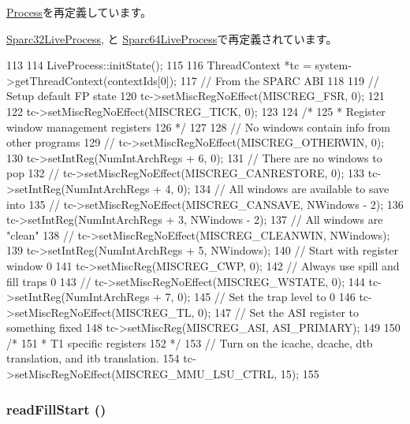 \hyperlink{classProcess_a3c34ea9b29f410748d4435a667484924}{Process}を再定義しています。

\hyperlink{classSparc32LiveProcess_a3c34ea9b29f410748d4435a667484924}{Sparc32LiveProcess}, と \hyperlink{classSparc64LiveProcess_a3c34ea9b29f410748d4435a667484924}{Sparc64LiveProcess}で再定義されています。


\begin{DoxyCode}
113 {
114     LiveProcess::initState();
115 
116     ThreadContext *tc = system->getThreadContext(contextIds[0]);
117     // From the SPARC ABI
118 
119     // Setup default FP state
120     tc->setMiscRegNoEffect(MISCREG_FSR, 0);
121 
122     tc->setMiscRegNoEffect(MISCREG_TICK, 0);
123 
124     /*
125      * Register window management registers
126      */
127 
128     // No windows contain info from other programs
129     // tc->setMiscRegNoEffect(MISCREG_OTHERWIN, 0);
130     tc->setIntReg(NumIntArchRegs + 6, 0);
131     // There are no windows to pop
132     // tc->setMiscRegNoEffect(MISCREG_CANRESTORE, 0);
133     tc->setIntReg(NumIntArchRegs + 4, 0);
134     // All windows are available to save into
135     // tc->setMiscRegNoEffect(MISCREG_CANSAVE, NWindows - 2);
136     tc->setIntReg(NumIntArchRegs + 3, NWindows - 2);
137     // All windows are "clean"
138     // tc->setMiscRegNoEffect(MISCREG_CLEANWIN, NWindows);
139     tc->setIntReg(NumIntArchRegs + 5, NWindows);
140     // Start with register window 0
141     tc->setMiscReg(MISCREG_CWP, 0);
142     // Always use spill and fill traps 0
143     // tc->setMiscRegNoEffect(MISCREG_WSTATE, 0);
144     tc->setIntReg(NumIntArchRegs + 7, 0);
145     // Set the trap level to 0
146     tc->setMiscRegNoEffect(MISCREG_TL, 0);
147     // Set the ASI register to something fixed
148     tc->setMiscReg(MISCREG_ASI, ASI_PRIMARY);
149 
150     /*
151      * T1 specific registers
152      */
153     // Turn on the icache, dcache, dtb translation, and itb translation.
154     tc->setMiscRegNoEffect(MISCREG_MMU_LSU_CTRL, 15);
155 }
\end{DoxyCode}
\hypertarget{classSparcLiveProcess_a21c8d5b3f25a0b2b07e7d6339507f484}{
\subsubsection[{readFillStart}]{ readFillStart ()}}
\label{classSparcLiveProcess_a21c8d5b3f25a0b2b07e7d6339507f484}



